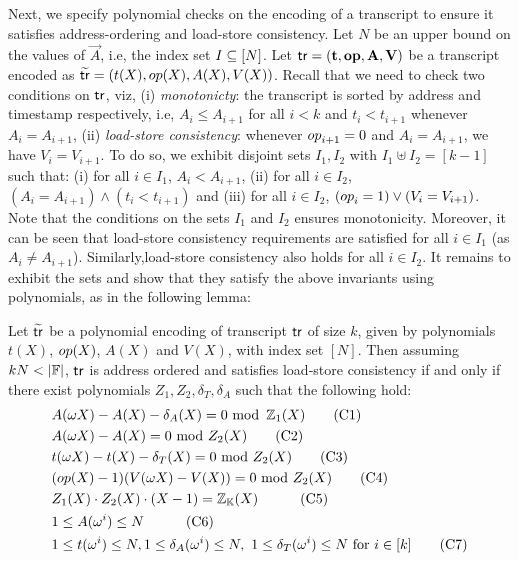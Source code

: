Next, we specify polynomial checks on the encoding of a transcript to ensure it satisfies address-ordering and load-store consistency.
Let $N$ be an upper bound on the values of $\vec{A}$, i.e, the index set $I\subseteq [N]$.
Let $\mathsf{tr}=(\mathbf{t},\mathbf{{op}},\mathbf{A},\mathbf{V})$ be a transcript encoded as
$\widetilde{\mathsf{tr}}=(t(X),{op}(X),A(X),V(X))$. Recall that we need to check two conditions on $\mathsf{tr}$, viz, (i) {\em monotonicty}:
the transcript is sorted by address and timestamp respectively, i.e, $A_i\leq A_{i+1}$ for all $i < k$ and
$t_i < t_{i+1}$ whenever $A_i=A_{i+1}$, (ii) {\em load-store consistency}: whenever ${op}_{i+1}=0$ and $A_i=A_{i+1}$,
we have $V_i=V_{i+1}$.
To do so, we exhibit disjoint sets $I_1,I_2$ with $I_1\uplus I_2=[k-1]$ such that: (i) for all
$i\in I_1$, $A_i < A_{i+1}$, (ii) for all $i\in I_2$, $(A_i = A_{i+1})\wedge (t_i < t_{i+1})$ and (iii) for all $i\in I_2$,
$({op}_i=1)\vee (V_i = V_{i+1})$.
Note that the conditions on the sets $I_1$ and $I_2$ ensures monotonicity.
Moreover, it can be seen that load-store consistency requirements are satisfied for all $i\in I_1$ (as $A_i\neq A_{i+1}$).
Similarly,load-store consistency also holds for all $i\in I_2$.
It remains to exhibit the sets and show that they satisfy the above invariants using polynomials, as in the following
lemma:
\begin{lemma}\label{lem:addr-ordered-transcript}
Let $\widetilde{\mathsf{tr}}$ be a polynomial encoding of transcript $\mathsf{tr}$ of size $k$, given by polynomials $t(X)$, ${op}(X)$, $A(X)$ and $V(X)$,
with index set $[N]$. Then assuming $kN<|\F|$, $\mathsf{tr}$ is address ordered and satisfies load-store consistency if and only if there exist polynomials
$Z_1,Z_2,\delta_T,\delta_A$
such that the following hold:
\begin{align}%
    & A(\omega X) - A(X) - \delta_A(X)= 0 \text{ mod }\, \mathbb{Z}_1(X) \tag{C1} \label{eq:C1} \\
    & A(\omega X) - A(X) = 0  \text{ mod } Z_2(X) \tag{C2} \label{eq:C2} \\
    & t(\omega X) - t(X) - \delta_T(X) = 0  \text{ mod } Z_2(X) \tag{C3} \label{eq:C3} \\
    & (\op(X) - 1)(V(\omega X) - V(X)) = 0  \text{ mod } Z_2(X) \tag{C4} \label{eq:C4} \\
    & Z_1(X)\cdot Z_2(X)\cdot (X-1) = \mathbb{Z}_\setH(X) \quad  \tag{C5} \label{eq:C5} \\
    & 1\leq A(\omega^i) \leq N  \quad \tag{C6} \label{eq:C6} \\
    & 1\leq t(\omega^i) \leq N, 1\leq \delta_A(\omega^i)\leq N,\ 1\leq \delta_T(\omega^i)\leq N \text{ for } i\in [k] \tag{C7} \label{eq:C7}
\end{align}
\end{lemma}
